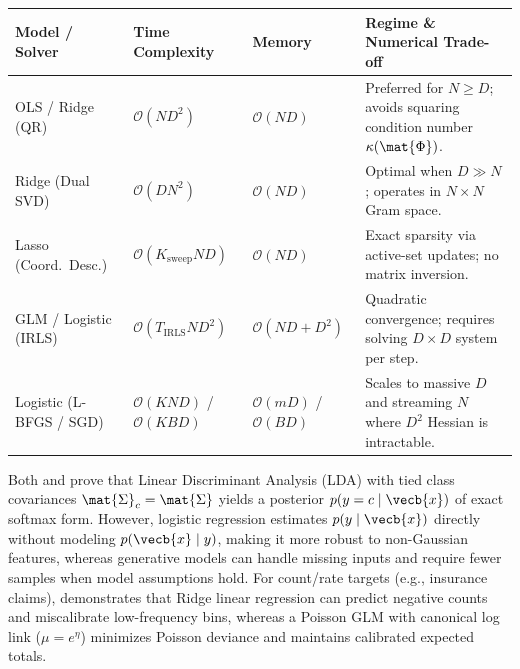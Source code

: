 \documentclass[../../../../master.tex]{subfiles}
\begin{document}
\begin{center}
\small
\setlength{\tabcolsep}{4pt}
\begin{tabularx}{\textwidth}{@{}l l l >{\raggedright\arraybackslash}X@{}}
\toprule
\textbf{Model / Solver} & \textbf{Time Complexity} & \textbf{Memory} & \textbf{Regime \& Numerical Trade-off} \\
\midrule
OLS / Ridge (QR) & $\mathcal{O}(ND^2)$ & $\mathcal{O}(ND)$ & Preferred for $N \ge D$; avoids squaring condition number $\kappa(\mat{\Phi})$. \\
Ridge (Dual SVD) & $\mathcal{O}(DN^2)$ & $\mathcal{O}(ND)$ & Optimal when $D \gg N$; operates in $N\times N$ Gram space. \\
Lasso (Coord.\ Desc.) & $\mathcal{O}(K_{\mathrm{sweep}} ND)$ & $\mathcal{O}(ND)$ & Exact sparsity via active-set updates; no matrix inversion. \\
GLM / Logistic (IRLS) & $\mathcal{O}(T_{\mathrm{IRLS}} ND^2)$ & $\mathcal{O}(ND + D^2)$ & Quadratic convergence; requires solving $D\times D$ system per step. \\
Logistic (L-BFGS / SGD) & $\mathcal{O}(K N D)$ / $\mathcal{O}(K B D)$ & $\mathcal{O}(mD)$ / $\mathcal{O}(BD)$ & Scales to massive $D$ and streaming $N$ where $D^2$ Hessian is intractable. \\
\bottomrule
\end{tabularx}
\label{tab:glm:complexity}
\end{center}

\begin{crossbook}
Both  and  prove that Linear Discriminant Analysis (LDA) with tied class covariances $\mat{\Sigma}_c = \mat{\Sigma}$ yields a posterior $p(y=c \mid \vecb{x})$ of exact softmax form. However, logistic regression estimates $p(y \mid \vecb{x})$ directly without modeling $p(\vecb{x} \mid y)$, making it more robust to non-Gaussian features, whereas generative models can handle missing inputs and require fewer samples when model assumptions hold. For count/rate targets (e.g., insurance claims),  demonstrates that Ridge linear regression can predict negative counts and miscalibrate low-frequency bins, whereas a Poisson GLM with canonical log link ($\mu = e^\eta$) minimizes Poisson deviance and maintains calibrated expected totals.
\end{crossbook}
\end{document}
